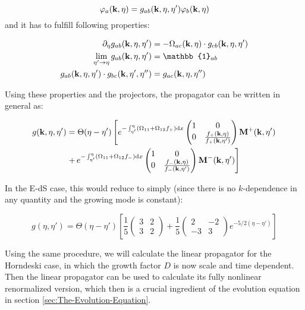 \[
\varphi_{a}(\mathbf{k},\eta)=g_{ab}(\mathbf{k},\eta,\eta')\varphi_{b}(\mathbf{k},\eta)
\]
and it has to fulfill following properties:

\begin{align*}
\pet g_{ab}(\vk k,\eta,\eta') & =-\Omega_{ac}\pkn\cdot g_{cb}(\vk k,\eta,\eta')\\
\lim_{\eta'\rightarrow\eta}g_{ab}(\vk k,\eta,\eta') & =\mathbb{1}_{ab}\\
g_{ab}(\vk k,\eta,\eta')\cdot g_{bc}(\vk k,\eta',\eta'') & =g_{ac}(\vk k,\eta,\eta'')
\end{align*}


Using these properties and the projectors, the propagator can be written
in general as:

\begin{equation}
\begin{aligned}g(\mathbf{k},\eta,\eta') & =\Theta(\eta-\eta')\left[e^{-\int_{\eta'}^{\eta}(\Omega_{11}+\Omega_{12}f_{+})\mathrm{d} x}\begin{pmatrix}1 & 0\\
0 & \frac{f_{+}(\mathbf{k},\eta)}{f_{+}(\mathbf{k},\eta')}
\end{pmatrix}\mathrm{\mathbf{M}}{}^{+}(\mathbf{k},\eta')\right.\\
 & \left.+\, e^{-\int_{\eta'}^{\eta}(\Omega_{11}+\Omega_{12}f_{-})\mathrm{d} x}\begin{pmatrix}1 & 0\\
0 & \frac{f_{-}(\mathbf{k},\eta)}{f_{-}(\mathbf{k},\eta')}
\end{pmatrix}\mathrm{\mathbf{M}}{}^{-}(\mathbf{k},\eta')\right]
\end{aligned}
\label{eq:general-propagator}
\end{equation}


In the E-dS case, this would reduce to simply (since there is no $k$-dependence
in any quantity and the growing mode is constant):

\[
g(\eta,\eta')=\Theta(\eta-\eta')\left[\frac{1}{5}\begin{pmatrix}3 & 2\\
3 & 2
\end{pmatrix}+\frac{1}{5}\begin{pmatrix}2 & -2\\
-3 & 3
\end{pmatrix}e^{-5/2(\eta-\eta')}\right]
\]


Using the same procedure, we will calculate the linear propagator
for the Horndeski case, in which the growth factor $D$ is now scale
and time dependent. Then the linear propagator can be used to calculate
its fully nonlinear renormalized version, which then is a crucial
ingredient of the evolution equation in section \ref{sec:The-Evolution-Equation}.


